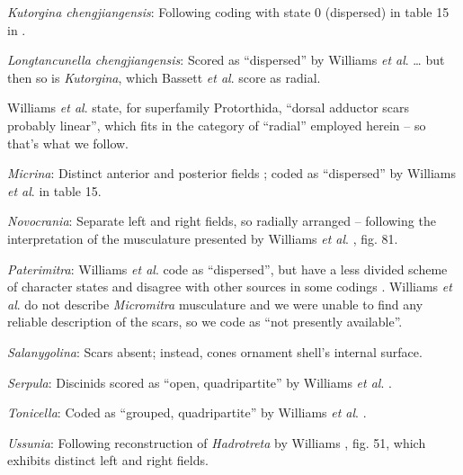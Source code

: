 \documentclass[openany]{book}
\theoremstyle{definition}
\theoremstyle{definition}
\theoremstyle{definition}
\theoremstyle{remark}
\begin{document}
\hypertarget{Kutorgina_chengjiangensis-coding-76}{}
\emph{Kutorgina chengjiangensis}: Following coding with state 0
(dispersed) in table 15 in
\citet{Williams2000LinguliformeaCraniiformea}.

\hypertarget{Longtancunella_chengjiangensis-coding-76}{}
\emph{Longtancunella chengjiangensis}: Scored as ``dispersed'' by
Williams \emph{et al}. \citeyearpar{Williams1998Thediversity} \ldots{}
but then so is \emph{Kutorgina}, which Bassett \emph{et al}.
\citeyearpar{Bassett2001Functionalmorphology} score as radial.

Williams \emph{et al}.
\citeyearpar{Williams2000LinguliformeaCraniiformea} state, for
superfamily Protorthida, ``dorsal adductor scars probably linear'',
which fits in the category of ``radial'' employed herein -- so that's
what we follow.

\hypertarget{Micrina-coding-76}{}
\emph{Micrina}: Distinct anterior and posterior fields
\citep{Chen2007Reinterpretationof}; coded as ``dispersed'' by Williams
\emph{et al}. \citeyearpar{Williams2000LinguliformeaCraniiformea} in
table 15.

\hypertarget{Novocrania-coding-76}{}
\emph{Novocrania}: Separate left and right fields, so radially arranged
-- following the interpretation of the musculature presented by Williams
\emph{et al}. \citeyearpar{Williams2000LinguliformeaCraniiformea}, fig.
81.

\hypertarget{Paterimitra-coding-76}{}
\emph{Paterimitra}: Williams \emph{et al}.
\citeyearpar{Williams1998Thediversity} code as ``dispersed'', but have a
less divided scheme of character states and disagree with other sources
in some codings \citep[e.g.][in
Kutorginates]{Bassett2001Functionalmorphology}. Williams \emph{et al}.
\citeyearpar{Williams2000LinguliformeaCraniiformea} do not describe
\emph{Micromitra} musculature and we were unable to find any reliable
description of the scars, so we code as ``not presently available''.

\hypertarget{Salanygolina-coding-76}{}
\emph{Salanygolina}: Scars absent; instead, cones ornament shell's
internal surface.

\hypertarget{Serpula-coding-76}{}
\emph{Serpula}: Discinids scored as ``open, quadripartite'' by Williams
\emph{et al}. \citeyearpar{Williams1996Asupra}.

\hypertarget{Tonicella-coding-76}{}
\emph{Tonicella}: Coded as ``grouped, quadripartite'' by Williams
\emph{et al}. \citeyearpar{Williams1996Asupra}.

\hypertarget{Ussunia-coding-76}{}
\emph{Ussunia}: Following reconstruction of \emph{Hadrotreta} by
Williams \citeyearpar{Williams2000LinguliformeaCraniiformea}, fig. 51,
which exhibits distinct left and right fields.
\end{document}

